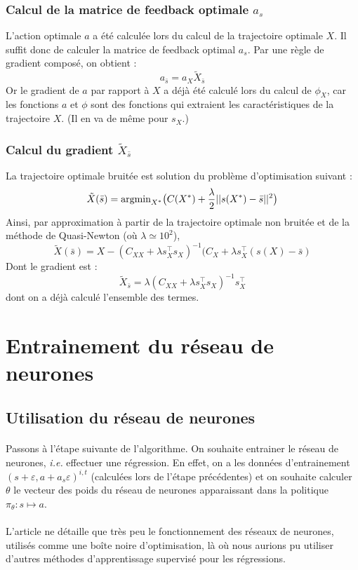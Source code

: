 \documentclass[a4paper,10pt]{article}
\begin{document}
  \subsubsection{Calcul de la matrice de feedback optimale $a_{s}$}
  L'action optimale $a$ a été calculée lors du calcul de la trajectoire optimale $X$. Il suffit donc de calculer la matrice de feedback optimal $a_{s}$.
  Par une règle de gradient composé, on obtient : 
  \[
  a_{\bar{s}} = a_{X}\tilde{X}_{\bar{s}}
  \]
  Or le gradient de $a$ par rapport à $X$ a déjà été calculé lors du calcul de $\phi_X$, car les fonctions $a$ et $\phi$ sont des fonctions qui extraient les caractéristiques de la trajectoire $X$. (Il en va de même pour $s_X$.)
  \subsubsection{Calcul du gradient $\tilde{X}_{\bar{s}}$}
  La trajectoire optimale bruitée est solution du problème d'optimisation suivant : 
  \[
  \tilde{X}(\bar{s}) = \text{argmin}_{X^{*}} \big{(}C(X^{*}) + \frac{\lambda}{2}||s(X^{*}) - \bar{s}||^{2}\big{)}
  \]
  Ainsi, par approximation à partir de la trajectoire optimale non bruitée et de la méthode de Quasi-Newton (où $\lambda \simeq 10^2$),
  \[
  \tilde{X}(\bar{s}) = X - (C_{XX} + \lambda s_{X}^{\top}s_{X})^{-1}(C_{X} + \lambda s_{X}^{\top}(s(X) - \bar{s})
  \]
  Dont le gradient est : 
    \[
  \tilde{X}_{\bar{s}} = \lambda(C_{XX} + \lambda s_{X}^{\top}s_{X})^{-1}s_{X}^{\top}
  \]
  dont on a déjà calculé l'ensemble des termes.
  
\section{Entrainement du réseau de neurones}
\subsection{Utilisation du réseau de neurones}
\paragraph{}
Passons à l'étape suivante de l'algorithme. On souhaite entrainer le réseau de neurones, \textit{i.e.} effectuer une régression. En effet, on a les données d'entrainement $(s + \varepsilon, a + a_{s}\varepsilon)^{i,t}$ (calculées lors de l'étape précédentes) et on souhaite calculer $\theta$ le vecteur des poids du réseau de neurones apparaissant dans la politique $\pi_{\theta} : s \mapsto a$.
\paragraph{}
L'article ne détaille que très peu le fonctionnement des réseaux de neurones, utilisés comme une boîte noire d'optimisation, là où nous aurions pu utiliser d'autres méthodes d'apprentissage supervisé pour les régressions. 
\end{document}
